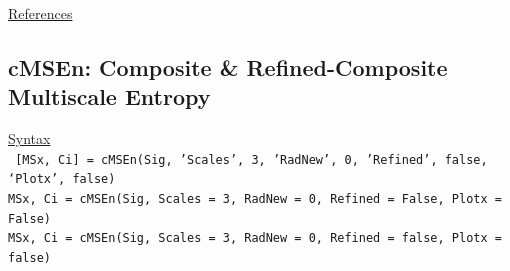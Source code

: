 \documentclass[12pt, a4paper, titlepage, openany]{book}
\begin{document}
\noindent \ul{References}\hspace{1cm}
\cite{MS1} \cite{MS2} \cite{MS3} \cite{MS4} \cite{MS5} \cite{MS6} \cite{MS7} \cite{MS8} \cite{MS9} \cite{MS10} \cite{MS11}



\newpage
\subsection{\normalsize cMSEn: \hspace{10mm} Composite \& Refined-Composite Multiscale Entropy}
\noindent\ul{Syntax} \vspace{6mm} \\ \noindent \texttt{\footnotesize
[MSx, Ci] = cMSEn(Sig, 'Scales', 3, 'RadNew', 0, 'Refined', false, ‘Plotx’, false)\\
MSx, Ci = cMSEn(Sig, Scales = 3, RadNew = 0, Refined = False, Plotx = False)\\ 
MSx, Ci = cMSEn(Sig, Scales = 3, RadNew = 0, Refined = false, Plotx = false)}
\end{document}
